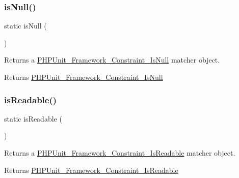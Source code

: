 \subsubsection{\texorpdfstring{is\+Null()}{isNull()}}
{\footnotesize\ttfamily static is\+Null (\begin{DoxyParamCaption}{ }\end{DoxyParamCaption})\hspace{0.3cm}{\ttfamily [static]}}

Returns a \mbox{\hyperlink{class_p_h_p_unit___framework___constraint___is_null}{P\+H\+P\+Unit\+\_\+\+Framework\+\_\+\+Constraint\+\_\+\+Is\+Null}} matcher object.

\begin{DoxyReturn}{Returns}
\mbox{\hyperlink{class_p_h_p_unit___framework___constraint___is_null}{P\+H\+P\+Unit\+\_\+\+Framework\+\_\+\+Constraint\+\_\+\+Is\+Null}} 
\end{DoxyReturn}
\mbox{\label{class_p_h_p_unit___framework___assert_a2e5a9a2013055d503a04a9902f32fa30}} 
\subsubsection{\texorpdfstring{is\+Readable()}{isReadable()}}
{\footnotesize\ttfamily static is\+Readable (\begin{DoxyParamCaption}{ }\end{DoxyParamCaption})\hspace{0.3cm}{\ttfamily [static]}}

Returns a \mbox{\hyperlink{class_p_h_p_unit___framework___constraint___is_readable}{P\+H\+P\+Unit\+\_\+\+Framework\+\_\+\+Constraint\+\_\+\+Is\+Readable}} matcher object.

\begin{DoxyReturn}{Returns}
\mbox{\hyperlink{class_p_h_p_unit___framework___constraint___is_readable}{P\+H\+P\+Unit\+\_\+\+Framework\+\_\+\+Constraint\+\_\+\+Is\+Readable}} 
\end{DoxyReturn}
\mbox{\label{class_p_h_p_unit___framework___assert_aec0d388399b30713c0f555e4939f8f68}} 
